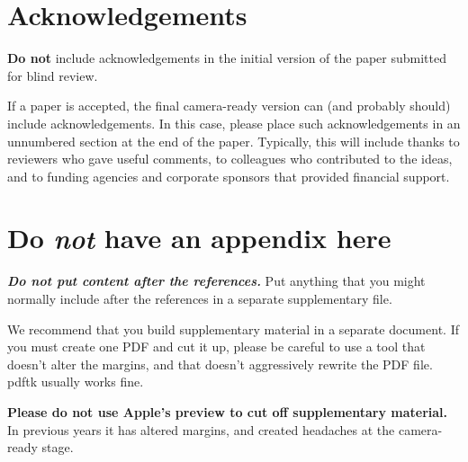 \documentclass{article}
\begin{document}
\section*{Acknowledgements}

\textbf{Do not} include acknowledgements in the initial version of
the paper submitted for blind review.

If a paper is accepted, the final camera-ready version can (and
probably should) include acknowledgements. In this case, please
place such acknowledgements in an unnumbered section at the
end of the paper. Typically, this will include thanks to reviewers
who gave useful comments, to colleagues who contributed to the ideas,
and to funding agencies and corporate sponsors that provided financial
support.


\nocite{langley00}





\appendix
\section{Do \emph{not} have an appendix here}

\textbf{\emph{Do not put content after the references.}}
%
Put anything that you might normally include after the references in a separate
supplementary file.

We recommend that you build supplementary material in a separate document.
If you must create one PDF and cut it up, please be careful to use a tool that
doesn't alter the margins, and that doesn't aggressively rewrite the PDF file.
pdftk usually works fine. 

\textbf{Please do not use Apple's preview to cut off supplementary material.} In
previous years it has altered margins, and created headaches at the camera-ready
stage. 
\end{document}
